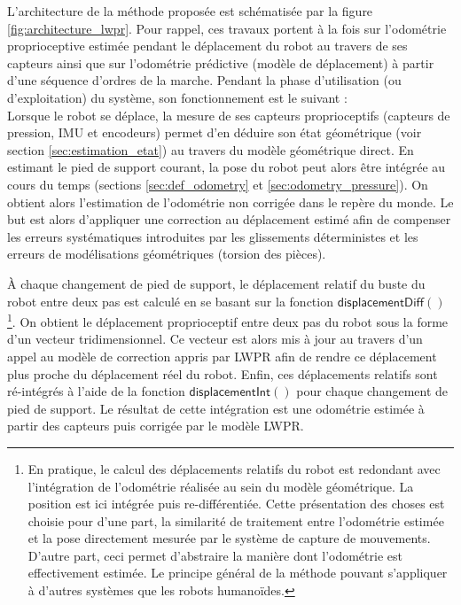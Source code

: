 L'architecture de la méthode proposée est schématisée par la figure \ref{fig:architecture_lwpr}.
Pour rappel, ces travaux portent à la fois sur l'odométrie proprioceptive estimée pendant
le déplacement du robot au travers de ses capteurs ainsi que sur l'odométrie prédictive
(modèle de déplacement) à partir d'une séquence d'ordres de la marche.
Pendant la phase d'utilisation (ou d'exploitation) du système, son
fonctionnement est le suivant :\\

Lorsque le robot se déplace, la mesure de ses capteurs proprioceptifs 
(capteurs de pression, IMU et encodeurs) permet d'en déduire son état géométrique
(voir section \ref{sec:estimation_etat}) au travers du modèle géométrique direct.
En estimant le pied de support courant, la pose du robot peut alors être intégrée 
au cours du temps (sections \ref{sec:def_odometry} et \ref{sec:odometry_pressure}).
On obtient alors l'estimation de l'odométrie non corrigée dans le repère du monde.
Le but est alors d'appliquer une correction au déplacement estimé
afin de compenser les erreurs systématiques introduites par les glissements déterministes et
les erreurs de modélisations géométriques (torsion des pièces).

À chaque changement de pied de support, le déplacement relatif du buste du robot
entre deux pas est calculé en se basant 
sur la fonction $\mathsf{displacementDiff}()$\footnote{En pratique, le calcul 
des déplacements relatifs du robot est redondant avec l'intégration de l'odométrie 
réalisée au sein du modèle géométrique. 
La position est ici intégrée puis re-différentiée. 
Cette présentation des choses est choisie pour d'une part, 
la similarité de traitement entre l'odométrie estimée et la pose directement 
mesurée par le système de capture de mouvements. 
D'autre part, ceci permet d'abstraire la manière dont l'odométrie est effectivement estimée. 
Le principe général de la méthode pouvant s'appliquer à d'autres 
systèmes que les robots humanoïdes.}.
On obtient le déplacement proprioceptif entre deux pas du robot sous
la forme d'un vecteur tridimensionnel.
Ce vecteur est alors mis à jour au travers d'un appel au modèle de correction
appris par LWPR afin de rendre ce déplacement plus proche du déplacement réel du robot.
Enfin, ces déplacements relatifs sont ré-intégrés à l'aide de la fonction 
$\mathsf{displacementInt}()$ pour chaque changement de pied de support.
Le résultat de cette intégration est une odométrie estimée à partir 
des capteurs puis corrigée par le modèle LWPR.\\


